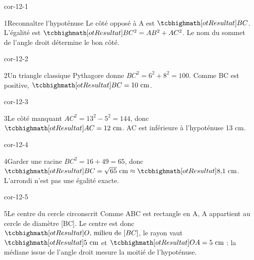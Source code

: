 \clearpage\pagestyle{otMain}\fontsize{11}{15}\selectfont{}
\begin{blocLivre}{cor-12-1}\begin{corrige}{1}{Reconnaître l’hypoténuse}
Le côté opposé à A est $\res{BC}$. L’égalité est $\res{BC^2=AB^2+AC^2}$. Le nom du sommet de l’angle droit détermine le bon côté.
\label{fig-cor-12-1}
\end{corrige}\end{blocLivre}
\begin{blocLivre}{cor-12-2}\begin{corrige}{2}{Un triangle classique}
Pythagore donne $BC^2=6^2+8^2=100$. Comme BC est positive, $\res{BC=10\text{ cm}}$.
\label{fig-cor-12-2}
\end{corrige}\end{blocLivre}
\begin{blocLivre}{cor-12-3}\begin{corrige}{3}{Le côté manquant}
$AC^2=13^2-5^2=144$, donc $\res{AC=12\text{ cm}}$. AC est inférieure à l’hypoténuse 13 cm.
\label{fig-cor-12-3}
\end{corrige}\end{blocLivre}
\begin{blocLivre}{cor-12-4}\begin{corrige}{4}{Garder une racine}
$BC^2=16+49=65$, donc $\res{BC=\sqrt{65}\text{ cm}}\approx\res{8{,}1\text{ cm}}$. L’arrondi n’est pas une égalité exacte.
\label{fig-cor-12-4}
\end{corrige}\end{blocLivre}
\begin{blocLivre}{cor-12-5}\begin{corrige}{5}{Le centre du cercle circonscrit}
Comme ABC est rectangle en A, A appartient au cercle de diamètre [BC]. Le centre est donc $\res{O\text{, milieu de }[BC]}$, le rayon vaut $\res{5\text{ cm}}$ et $\res{OA=5\text{ cm}}$ : la médiane issue de l’angle droit mesure la moitié de l’hypoténuse.
\label{fig-cor-12-5}
\end{corrige}\end{blocLivre}
